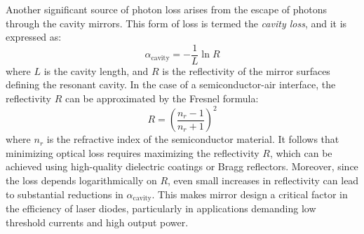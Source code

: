 Another significant source of photon loss arises from the escape of photons through the cavity mirrors. This form of loss is termed the \textit{cavity loss}, and it is expressed as:
\begin{equation}
	\alpha_{\text{cavity}} = -\frac{1}{L} \ln R
\end{equation}
where \( L \) is the cavity length, and \( R \) is the reflectivity of the mirror surfaces defining the resonant cavity.
In the case of a semiconductor-air interface, the reflectivity \( R \) can be approximated by the Fresnel formula:
\begin{equation}
	R = \left( \frac{n_r - 1}{n_r + 1} \right)^2
\end{equation}
where \( n_r \) is the refractive index of the semiconductor material.
It follows that minimizing optical loss requires maximizing the reflectivity \( R \), which can be achieved using high-quality dielectric coatings or Bragg reflectors. Moreover, since the loss depends logarithmically on \( R \), even small increases in reflectivity can lead to substantial reductions in \( \alpha_{\text{cavity}} \). This makes mirror design a critical factor in the efficiency of laser diodes, particularly in applications demanding low threshold currents and high output power.

